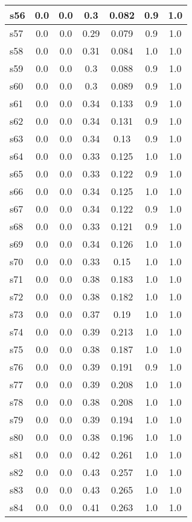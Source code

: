\documentclass{article}
\begin{document}
\begin{tabular}{|l|c|c|c|c|c|c|}
\hline
s56 &0.0 & 0.0 & 0.3 & 0.082 & 0.9 & 1.0\\
\hline
s57 &0.0 & 0.0 & 0.29 & 0.079 & 0.9 & 1.0\\
\hline
s58 &0.0 & 0.0 & 0.31 & 0.084 & 1.0 & 1.0\\
\hline
s59 &0.0 & 0.0 & 0.3 & 0.088 & 0.9 & 1.0\\
\hline
s60 &0.0 & 0.0 & 0.3 & 0.089 & 0.9 & 1.0\\
\hline
s61 &0.0 & 0.0 & 0.34 & 0.133 & 0.9 & 1.0\\
\hline
s62 &0.0 & 0.0 & 0.34 & 0.131 & 0.9 & 1.0\\
\hline
s63 &0.0 & 0.0 & 0.34 & 0.13 & 0.9 & 1.0\\
\hline
s64 &0.0 & 0.0 & 0.33 & 0.125 & 1.0 & 1.0\\
\hline
s65 &0.0 & 0.0 & 0.33 & 0.122 & 0.9 & 1.0\\
\hline
s66 &0.0 & 0.0 & 0.34 & 0.125 & 1.0 & 1.0\\
\hline
s67 &0.0 & 0.0 & 0.34 & 0.122 & 0.9 & 1.0\\
\hline
s68 &0.0 & 0.0 & 0.33 & 0.121 & 0.9 & 1.0\\
\hline
s69 &0.0 & 0.0 & 0.34 & 0.126 & 1.0 & 1.0\\
\hline
s70 &0.0 & 0.0 & 0.33 & 0.15 & 1.0 & 1.0\\
\hline
s71 &0.0 & 0.0 & 0.38 & 0.183 & 1.0 & 1.0\\
\hline
s72 &0.0 & 0.0 & 0.38 & 0.182 & 1.0 & 1.0\\
\hline
s73 &0.0 & 0.0 & 0.37 & 0.19 & 1.0 & 1.0\\
\hline
s74 &0.0 & 0.0 & 0.39 & 0.213 & 1.0 & 1.0\\
\hline
s75 &0.0 & 0.0 & 0.38 & 0.187 & 1.0 & 1.0\\
\hline
s76 &0.0 & 0.0 & 0.39 & 0.191 & 0.9 & 1.0\\
\hline
s77 &0.0 & 0.0 & 0.39 & 0.208 & 1.0 & 1.0\\
\hline
s78 &0.0 & 0.0 & 0.38 & 0.208 & 1.0 & 1.0\\
\hline
s79 &0.0 & 0.0 & 0.39 & 0.194 & 1.0 & 1.0\\
\hline
s80 &0.0 & 0.0 & 0.38 & 0.196 & 1.0 & 1.0\\
\hline
s81 &0.0 & 0.0 & 0.42 & 0.261 & 1.0 & 1.0\\
\hline
s82 &0.0 & 0.0 & 0.43 & 0.257 & 1.0 & 1.0\\
\hline
s83 &0.0 & 0.0 & 0.43 & 0.265 & 1.0 & 1.0\\
\hline
s84 &0.0 & 0.0 & 0.41 & 0.263 & 1.0 & 1.0\\

\end{tabular}
\end{document}
